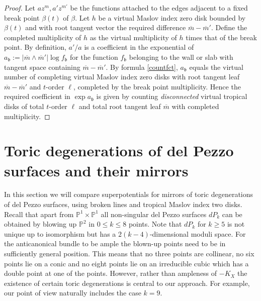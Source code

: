 \documentclass[11pt,letter]{amsart}
\theoremstyle{definition}
\theoremstyle{remark}
\numberwithin{equation}{section}
\numberwithin{figure}{section}
\newcommand{\PP} {\mathbb{P}}
\newcommand {\fob}  {\mathfrak{b}}
\begin{document}
\begin{proof}
Let $az^m, a'z^{m'}$ be the functions attached to the edges adjacent to a fixed
break point $\beta(t)$ of $\beta$. Let $h$ be a virtual Maslov index zero disk
bounded by $\beta(t)$ and with root tangent vector the required difference
$\overline m- \overline m'$. Define the completed multiplicity of $h$ as the
virtual multiplicity of $h$ times that of the break point. By definition, $a'/a$
is a coefficient in the exponential of $a_\fob:=|\overline m \wedge \overline
m'| \log f_{\fob}$ for the function $f_\fob$ belonging to the wall or slab with
tangent space containing $\overline m-\overline m'$. By formula
\eqref{countfct}, $a_\fob$ equals the virtual number of completing virtual
Maslov index zero disks with root tangent leaf $\overline m - \overline m'$ and
$t$-order $\ell$, completed by the break point multiplicity. Hence the required
coefficient in $\exp a_\fob$ is given by counting {\em disconnected} virtual
tropical disks of total $t$-order $\ell$ and total root tangent leaf $\overline
m$ with completed multiplicity.
\end{proof}



\section{Toric degenerations of del Pezzo surfaces and their mirrors}
\label{sect:delpezzo}
In this section we will compare superpotentials for mirrors of toric
degenerations of del Pezzo surfaces, using broken lines and tropical Maslov
index two disks. Recall that apart from $\PP^1 \times \PP^1$ all non-singular
del Pezzo surfaces $dP_k$ can be obtained by blowing up $\PP^2$ in $0 \leq k
\leq 8$ points. Note that $dP_k$ for $k\ge 5$ is not unique up to isomorphism
but has a $2(k-4)$-dimensional moduli space. For the anticanonical bundle to be
ample the blown-up points need to be in sufficiently general position. This
means that no three points are collinear, no six points lie on a conic and no
eight points lie on an irreducible cubic which has a double point at one of the
points. However, rather than ampleness of $-K_X$ the existence of certain toric
degenerations is central to our approach. For example, our point of view
naturally includes the case $k=9$.

\end{document}
